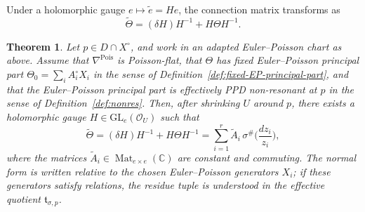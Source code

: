\documentclass[11pt]{amsart}
\theoremstyle{plain}
\newtheorem{theorem}{Theorem}[section]
\theoremstyle{definition}
\DeclareMathOperator{\Mat}{Mat}
\newcommand{\GL}{\mathrm{GL}}
\theoremstyle{definition}
\newcommand{\C}{\mathbb{C}}
\newcommand{\OO}{\mathcal{O}}
\begin{document}
Under a holomorphic gauge $e\mapsto \widetilde e=He$, the connection matrix transforms as
\[
\widetilde\Theta=(\delta H)H^{-1}+H\Theta H^{-1}.
\]

\begin{theorem} \label{thm:PPD-local}
Let $p\in D\cap X^\circ$, and work in an adapted Euler--Poisson chart as above.  Assume that $\nabla^{\mathrm{Pois}}$ is Poisson-flat, that $\Theta$ has fixed Euler--Poisson principal part $\Theta_0=\sum_i A_i^\circ X_i$ in the sense of Definition~\ref{def:fixed-EP-principal-part}, and that the Euler--Poisson principal part is effectively PPD non-resonant at $p$ in the sense of Definition~\ref{def:nonres}.  Then, after shrinking $U$ around $p$, there exists a holomorphic gauge $H\in\GL_e(\OO_U)$ such that
\begin{equation}\label{eq:PPD-Theta}
\widetilde\Theta=(\delta H)H^{-1}+H\Theta H^{-1}
=\sum_{i=1}^r \widetilde A_i\,\sigma^\#\Big(\frac{dz_i}{z_i}\Big),
\end{equation}
where the matrices $\widetilde A_i\in\Mat_{e\times e}(\C)$ are constant and commuting.  The normal form is written relative to the chosen Euler--Poisson generators $X_i$; if these generators satisfy relations, the residue tuple is understood in the effective quotient $\mathfrak t_{\sigma,p}$.
\end{theorem}
\end{document}

